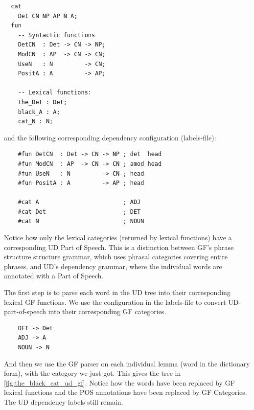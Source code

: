 \begin{verbatim}
  cat
    Det CN NP AP N A;
  fun
    -- Syntactic functions
    DetCN  : Det -> CN -> NP;
    ModCN  : AP  -> CN -> CN;
    UseN   : N         -> CN;
    PositA : A         -> AP;

    -- Lexical functions:
    the_Det : Det;
    black_A : A;
    cat_N : N;
\end{verbatim}
and the following corresponding dependency configuration (labels-file):
\begin{verbatim}
    #fun DetCN  : Det -> CN -> NP ; det  head
    #fun ModCN  : AP  -> CN -> CN ; amod head
    #fun UseN   : N         -> CN ; head
    #fun PositA : A         -> AP ; head
    
    #cat A                        ; ADJ
    #cat Det                      ; DET
    #cat N                        ; NOUN
\end{verbatim}

Notice how only the lexical categories (returned by lexical functions) have a corresponding UD Part of Speech. This is a distinction between GF's phrase structure structure grammar, which uses phrasal categories covering entire phrases, and UD's dependency grammar, where the individual words are annotated with a Part of Speech. 

The first step is to parse each word in the UD tree into their corresponding lexical GF functions. We use the configuration in the labels-file to convert UD-part-of-speech into their corresponding GF categories.
\begin{verbatim}
    DET -> Det
    ADJ -> A
    NOUN -> N
\end{verbatim}
And then we use the GF parser on each individual lemma (word in the dictionary form), with the category we just got.
This gives the tree in \autoref{fig:the_black_cat_ud_gf}. Notice how the words have been replaced by GF lexical functions and the POS annotations have been replaced by GF Categories. The UD dependency labels still remain.

